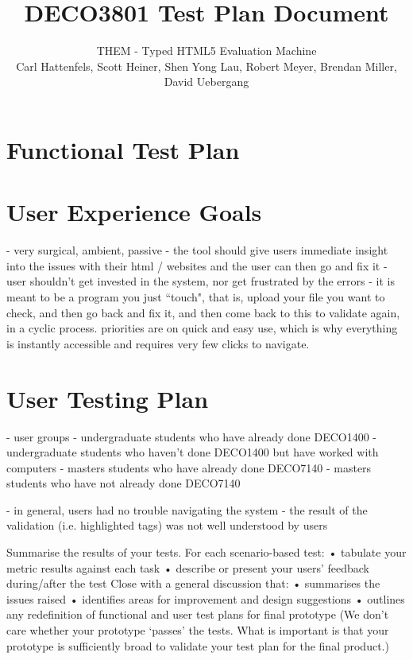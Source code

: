 \documentclass[12pt]{article}
\title{\bf DECO3801 Test Plan Document}
\author{\normalsize THEM - Typed HTML5 Evaluation Machine \\ \normalsize Carl Hattenfels, Scott Heiner, Shen Yong Lau, Robert Meyer, Brendan Miller, David Uebergang}
\date{}
\begin{document}
\maketitle

\section*{Functional Test Plan}

\section*{User Experience Goals}

- very surgical, ambient, passive
- the tool should give users immediate insight into the issues with their html / websites and the user can then go and fix it
- user shouldn't get invested in the system, nor get frustrated by the errors
- it is meant to be a program you just ``touch", that is, upload your file you want to check, and then go back and fix it, and then come back to this to validate again, in a cyclic process. priorities are on quick and easy use, which is why everything is instantly accessible and requires very few clicks to navigate.

\section*{User Testing Plan}

- user groups
  - undergraduate students who have already done DECO1400
  - undergraduate students who haven't done DECO1400 but have worked with computers
  - masters students who have already done DECO7140
  - masters students who have not already done DECO7140

- in general, users had no trouble navigating the system
- the result of the validation (i.e. highlighted tags) was not well understood by users

Summarise the results of your tests. 
For each scenario-based test: 
• tabulate your metric results against each task 
• describe or present your users’ feedback during/after the test 
Close with a general discussion that: 
• summarises the issues raised 
• identifies areas for improvement and design suggestions 
• outlines any redefinition of functional and user test plans for final 
prototype 
(We don’t care whether your prototype ‘passes’ the tests. What is 
important is that your prototype is sufficiently broad to validate your test 
plan for the final product.)
\end{document}
